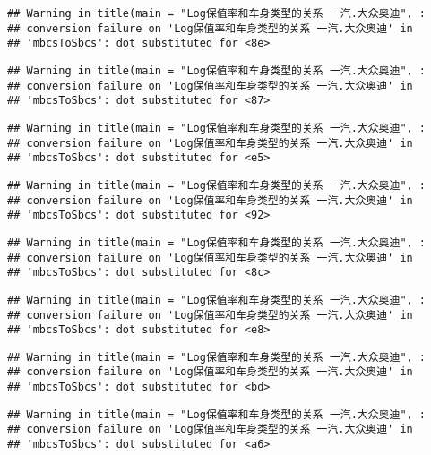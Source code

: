 \documentclass[]{article}
\begin{document}
\begin{verbatim}
## Warning in title(main = "Log保值率和车身类型的关系 一汽.大众奥迪", :
## conversion failure on 'Log保值率和车身类型的关系 一汽.大众奥迪' in
## 'mbcsToSbcs': dot substituted for <8e>
\end{verbatim}

\begin{verbatim}
## Warning in title(main = "Log保值率和车身类型的关系 一汽.大众奥迪", :
## conversion failure on 'Log保值率和车身类型的关系 一汽.大众奥迪' in
## 'mbcsToSbcs': dot substituted for <87>
\end{verbatim}

\begin{verbatim}
## Warning in title(main = "Log保值率和车身类型的关系 一汽.大众奥迪", :
## conversion failure on 'Log保值率和车身类型的关系 一汽.大众奥迪' in
## 'mbcsToSbcs': dot substituted for <e5>
\end{verbatim}

\begin{verbatim}
## Warning in title(main = "Log保值率和车身类型的关系 一汽.大众奥迪", :
## conversion failure on 'Log保值率和车身类型的关系 一汽.大众奥迪' in
## 'mbcsToSbcs': dot substituted for <92>
\end{verbatim}

\begin{verbatim}
## Warning in title(main = "Log保值率和车身类型的关系 一汽.大众奥迪", :
## conversion failure on 'Log保值率和车身类型的关系 一汽.大众奥迪' in
## 'mbcsToSbcs': dot substituted for <8c>
\end{verbatim}

\begin{verbatim}
## Warning in title(main = "Log保值率和车身类型的关系 一汽.大众奥迪", :
## conversion failure on 'Log保值率和车身类型的关系 一汽.大众奥迪' in
## 'mbcsToSbcs': dot substituted for <e8>
\end{verbatim}

\begin{verbatim}
## Warning in title(main = "Log保值率和车身类型的关系 一汽.大众奥迪", :
## conversion failure on 'Log保值率和车身类型的关系 一汽.大众奥迪' in
## 'mbcsToSbcs': dot substituted for <bd>
\end{verbatim}

\begin{verbatim}
## Warning in title(main = "Log保值率和车身类型的关系 一汽.大众奥迪", :
## conversion failure on 'Log保值率和车身类型的关系 一汽.大众奥迪' in
## 'mbcsToSbcs': dot substituted for <a6>
\end{verbatim}
\end{document}

